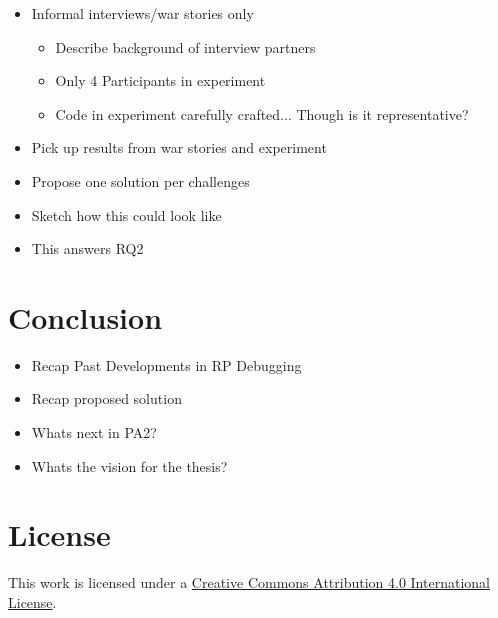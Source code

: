 \documentclass[12pt,a4paper]{article}
\begin{document}
\begin{itemize}
	\item Informal interviews/war stories only
	\begin{itemize}
		\item Describe background of interview partners
		\item Only 4 Participants in experiment
		\item Code in experiment carefully crafted... Though is it representative?
		\
	\end{itemize}
\end{itemize}


\begin{itemize}
	\item Pick up results from war stories and experiment
	\item Propose one solution per challenges
	\item Sketch how this could look like
	\item This answers RQ2
\end{itemize}

\section{Conclusion}
\label{sec:conclusion}

\begin{itemize}
	\item Recap Past Developments in RP Debugging
	\item Recap proposed solution
	\item Whats next in PA2?
	\item Whats the vision for the thesis?
\end{itemize}





\section*{License}
\ccby\thinspace\thinspace This work is licensed under a \href{https://creativecommons.org/licenses/by/4.0/}{Creative Commons Attribution 4.0 International License}.
\end{document}
